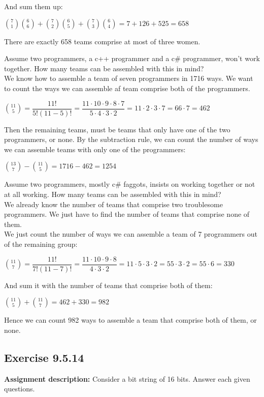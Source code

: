 \documentclass{report}
\newcommand{\cent}[1]{\begin{center}#1\end{center}}
\newcommand{\AssignmentDescription}{\textbf{Assignment description: }}
\newcommand{\Exercise}[1]{\subsection{Exercise #1}}
\newcommand{\MyItem}[1]{\item #1\\}
\begin{document}
{		And sum them up:
		
		\cent{$\binom{7}{1}\binom{6}{6}+\binom{7}{2}\binom{6}{5} + \binom{7}{3}\binom{6}{4} = 7 + 126 + 525 = 658$}
		
		There are exactly 658 teams comprise at most of three women.\\
		
		\MyItem{Assume two programmers, a c++ programmer and a c\# programmer, won't work together. How many teams can be assembled with this in mind?}
		
		We know how to assemble a team of seven programmers in 1716 ways. We want to count the ways we can assemble af team comprise both of the programmers. 
		
		\cent{$\binom{11}{5} = \dfrac{11!}{5!(11-5)!} = \dfrac{11 \cdot  10 \cdot  9 \cdot 8 \cdot  7}{5 \cdot  4 \cdot  3 \cdot 2} = 11 \cdot  2 \cdot  3  \cdot  7 = 66 \cdot 7 = 462 $}
		
		Then the remaining teams, must be teams that only have one of the two programmers, or none. By the subtraction rule, we can count the number of ways we can assemble teams with only one of the programmers:
		
		\cent{$\binom{13}{7} - \binom{11}{5} = 1716-462 = 1254$}
		
		
		
		\MyItem{Assume two programmers, mostly c\# faggots, insists on working together or not at all working. How many teams can be assembled with this in mind?}
		
		We already know the number of teams that comprise two troublesome programmers. We just have to find the number of teams that comprise none of them.\\
		
		We just count the number of ways we can assemble a team of 7 programmers out of the remaining group:
		
		\cent{$\binom{11}{7} = \dfrac{11!}{7!(11-7)!} = \dfrac{11 \cdot 10 \cdot 9 \cdot 8}{4 \cdot 3 \cdot 2} = 11 \cdot 5 \cdot 3 \cdot 2 = 55 \cdot 3 \cdot 2 = 55 \cdot 6 = 330$}
		
		And sum it with the number of teams that comprise both of them:
		
		\cent{$\binom{11}{5} + \binom{11}{7} = 462 + 330 = 982$}
		
		Hence we can count 982 ways to assemble a team that comprise both of them, or none.\\
 	}
 	\Exercise{9.5.14}
 	\AssignmentDescription
 	Consider a bit string of 16 bits. Answer each given questions.\\
 	
\end{document}
